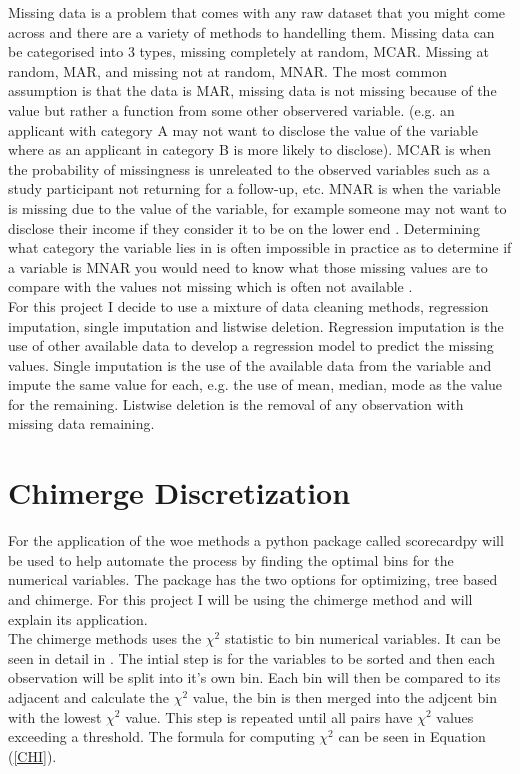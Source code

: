 Missing data is a problem that comes with any raw dataset that you might come across and there are a variety of methods to handelling them. Missing data can be categorised into 3 types, missing completely at random, MCAR. Missing at random, MAR, and missing not at random, MNAR. The most common assumption is that the data is MAR, missing data is not missing because of the value but rather a function from some other observered variable. (e.g. an applicant with category A may not want to disclose the value of the variable where as an applicant in category B is more likely to disclose). MCAR is when the probability of missingness is unreleated to the observed variables such as a study participant not returning for a follow-up, etc. MNAR is when the variable is missing due to the value of the variable, for example someone may not want to disclose their income if they consider it to be on the lower end \parencite{buhi2008out}. Determining what category the variable lies in is often impossible in practice as to determine if a variable is MNAR you would need to know what those missing values are to compare with the values not missing which is often not available \parencite{newman2014missing}.\\

For this project I decide to use a mixture of data cleaning methods, regression imputation, single imputation and listwise deletion. Regression imputation is the use of other available data to develop a regression model to predict the missing values. Single imputation is the use of the available data from the variable and impute the same value for each, e.g. the use of mean, median, mode as the value for the remaining. Listwise deletion is the removal of any observation with missing data remaining.

\section{Chimerge Discretization} \label{chimerge}

For the application of the woe methods a python package called scorecardpy will be used to help automate the process by finding the optimal bins for the numerical variables. The package has the two options for optimizing, tree based and chimerge. For this project I will be using the chimerge method and will explain its application. \\

The chimerge methods uses the $\chi^2$ statistic to bin numerical variables. It can be seen in detail in \parencite{kerber1992chimerge}. The intial step is for the variables to be sorted and then each observation will be split into it's own bin. Each bin will then be compared to its adjacent and calculate the $\chi^2$ value, the bin is then merged into the adjcent bin with the lowest $\chi^2$ value. This step is repeated until all pairs have $\chi^2$ values exceeding a threshold. The formula for computing $\chi^2$ can be seen in Equation (\ref{CHI}).


